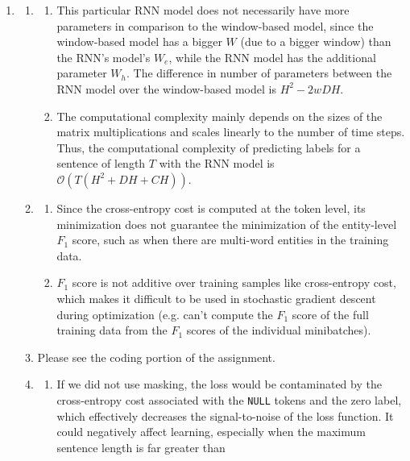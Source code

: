 \documentclass[10pt,reqno]{amsart}
\begin{document}
\begin{enumerate}[topsep=0pt,itemsep=3ex,partopsep=1ex,parsep=1ex]
\item
  \begin{enumerate}[itemsep=2ex]
  \item 
    \begin{enumerate}[itemsep=2ex]
      \item This particular RNN model does not necessarily have more parameters in 
        comparison to the window-based model, since the window-based model has a 
        bigger $W$ (due to a bigger window) than the RNN's model's $W_e$, while the RNN model 
        has the additional parameter $W_h$.
        The difference in number of parameters between the RNN model over 
        the window-based model is $H^2 - 2wDH$.
      \item The computational complexity mainly depends on the sizes of the 
        matrix multiplications and scales linearly to the number of time steps.
        Thus, the computational complexity of predicting labels for a sentence of length $T$
        with the RNN model is $\mathcal{O}(T(H^2+DH+CH))$.
    \end{enumerate}
  \item 
    \begin{enumerate}[itemsep=2ex]
      \item Since the cross-entropy cost is computed at the token level, its minimization
        does not guarantee the minimization of the entity-level $F_1$ score, such as when there 
        are multi-word entities in the training data. 
      \item $F_1$ score is not additive over training samples like cross-entropy cost, which makes 
        it difficult to be used in stochastic gradient descent during optimization (e.g. can't 
        compute the $F_1$ score of the full training data from the $F_1$ scores of the individual minibatches).
    \end{enumerate}
  \item Please see the coding portion of the assignment.
  \item 
    \begin{enumerate}[itemsep=2ex]
      \item If we did not use masking, the loss would be contaminated by the cross-entropy cost 
        associated with the \texttt{NULL} tokens and the zero label, which effectively decreases the signal-to-noise 
        of the loss function. It could negatively affect learning, especially  when the maximum sentence length is far greater than 

\end{enumerate}
\end{enumerate}
\end{enumerate}
\end{document}
